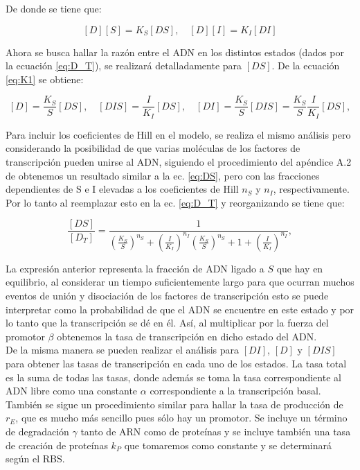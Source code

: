\documentclass[12pt]{article}
\begin{document}
De donde se tiene que:

\begin{equation}
\label{eq:K1}
[D][S]=K_S[DS], \quad [D][I]=K_I[DI] 
\end{equation}

Ahora se busca hallar la raz\'on entre el ADN en los distintos estados (dados por la ecuaci\'on \ref{eq:D_T}), se realizar\'a detalladamente para $[DS]$. De la ecuaci\'on \ref{eq:K1} se obtiene:

\begin{equation}
\label{eq:DS}
[D] = \frac{K_S}{S}[DS], \quad [DIS] = \frac{I}{K_I}[DS], \quad [DI]=\frac{K_S}{S}[DIS]=\frac{K_S}{S}\frac{I}{K_I}[DS],
\end{equation}

Para incluir los coeficientes de Hill en el modelo, se realiza el mismo an\'alisis pero considerando la posibilidad de que varias mol\'eculas de los factores de transcripci\'on pueden unirse al ADN, siguiendo el procedimiento del ap\'endice A.2 de \cite{alon06} obtenemos un resultado similar a la ec. \ref{eq:DS}, pero con las fracciones dependientes de S e I elevadas a los coeficientes de Hill $n_S$ y $n_I$, respectivamente. Por lo tanto al reemplazar esto en la ec. \ref{eq:D_T} y reorganizando se tiene que:

\begin{equation}
\frac{[DS]}{[D_T]} = \frac{1}{\left( \frac{K_S}{S} \right)^{n_S} + \left( \frac{I}{K_I} \right)^{n_I} \left( \frac{K_S}{S} \right)^{n_S} + 1 + \left( \frac{I}{K_I} \right)^{n_I}},
\end{equation}

La expresi\'on anterior representa la fracci\'on de ADN ligado a $S$ que hay en equilibrio, al considerar un tiempo suficientemente largo para que ocurran muchos eventos de uni\'on y disociaci\'on de los factores de transcripci\'on esto se puede interpretar como la probabilidad de que el ADN se encuentre en este estado y por lo tanto que la transcripci\'on se d\'e en \'el. As\'i, al multiplicar por la fuerza del promotor $\beta$ obtenemos la tasa de transcripci\'on en dicho estado del ADN.\\

De la misma manera se pueden realizar el an\'alisis para $[DI]$, $[D]$ y $[DIS]$ para obtener las tasas de transcripci\'on en cada uno de los estados. La tasa total es la suma de todas las tasas, donde adem\'as se toma la tasa correspondiente al ADN libre como una constante $\alpha$ correspondiente a la transcripci\'on basal. Tambi\'en se sigue un procedimiento similar para hallar la tasa de producci\'on de $r_E$, que es mucho m\'as sencillo pues s\'olo hay un promotor. Se incluye un t\'ermino de degradaci\'on $\gamma$ tanto de ARN como de prote\'inas y se incluye tambi\'en una tasa de creaci\'on de prote\'inas $k_P$ que tomaremos como constante y se determinar\'a seg\'un el RBS.
\end{document}

